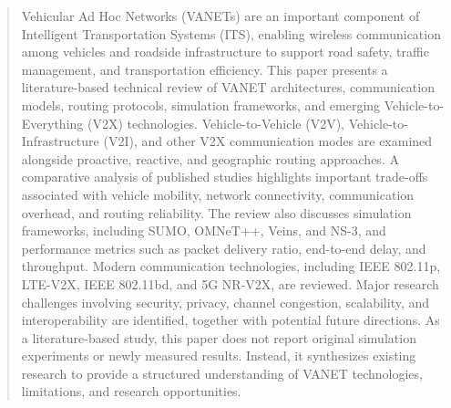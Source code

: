 
\setlength{\parindent}{0em}

\begin{abstract}

Vehicular Ad Hoc Networks (VANETs) are an important
component of Intelligent Transportation Systems (ITS),
enabling wireless communication among vehicles and
roadside infrastructure to support road safety,
traffic management, and transportation efficiency.
This paper presents a literature-based technical
review of VANET architectures, communication models,
routing protocols, simulation frameworks, and
emerging Vehicle-to-Everything (V2X) technologies.
Vehicle-to-Vehicle (V2V), Vehicle-to-Infrastructure
(V2I), and other V2X communication modes are examined
alongside proactive, reactive, and geographic routing
approaches. A comparative analysis of published
studies highlights important trade-offs associated
with vehicle mobility, network connectivity,
communication overhead, and routing reliability.
The review also discusses simulation frameworks,
including SUMO, OMNeT++, Veins, and NS-3, and
performance metrics such as packet delivery ratio,
end-to-end delay, and throughput. Modern communication
technologies, including IEEE 802.11p, LTE-V2X,
IEEE 802.11bd, and 5G NR-V2X, are reviewed.
Major research challenges involving security,
privacy, channel congestion, scalability, and
interoperability are identified, together with
potential future directions. As a literature-based
study, this paper does not report original
simulation experiments or newly measured results.
Instead, it synthesizes existing research to
provide a structured understanding of VANET
technologies, limitations, and research opportunities.

\end{abstract}
